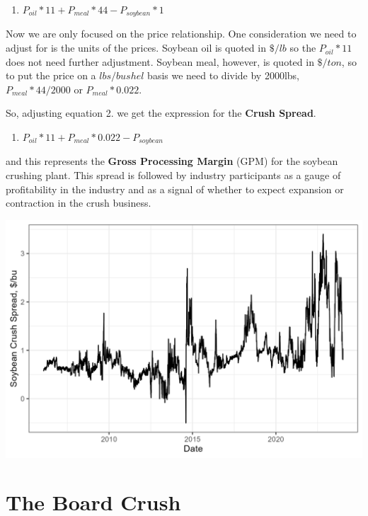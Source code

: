 \documentclass[
  letterpaper,
  DIV=11,
  numbers=noendperiod]{scrreprt}
\providecommand{\tightlist}{%
  \setlength{\itemsep}{0pt}\setlength{\parskip}{0pt}}\usepackage{longtable,booktabs,array}
\begin{document}
\begin{enumerate}
\def\labelenumi{\arabic{enumi}.}
\setcounter{enumi}{1}
\tightlist
\item
  \(P_{oil}*11 + P_{meal}*44 - P_{soybean}*1\)
\end{enumerate}

Now we are only focused on the price relationship. One consideration we
need to adjust for is the units of the prices. Soybean oil is quoted in
\(\$/lb\) so the \(P_{oil}*11\) does not need further adjustment.
Soybean meal, however, is quoted in \(\$/ton\), so to put the price on a
\(lbs/bushel\) basis we need to divide by 2000lbs, \(P_{meal}*44/2000\)
or \(P_{meal}*0.022\).

So, adjusting equation 2. we get the expression for the \textbf{Crush
Spread}.

\begin{enumerate}
\def\labelenumi{\arabic{enumi}.}
\setcounter{enumi}{2}
\tightlist
\item
  \(P_{oil}*11 + P_{meal}*0.022 - P_{soybean}\)
\end{enumerate}

and this represents the \textbf{Gross Processing Margin} (GPM) for the
soybean crushing plant. This spread is followed by industry participants
as a gauge of profitability in the industry and as a signal of whether
to expect expansion or contraction in the crush business.

\includegraphics{assets/SoyCrushSpread.png}

\section{The Board Crush}\label{the-board-crush}
\end{document}
